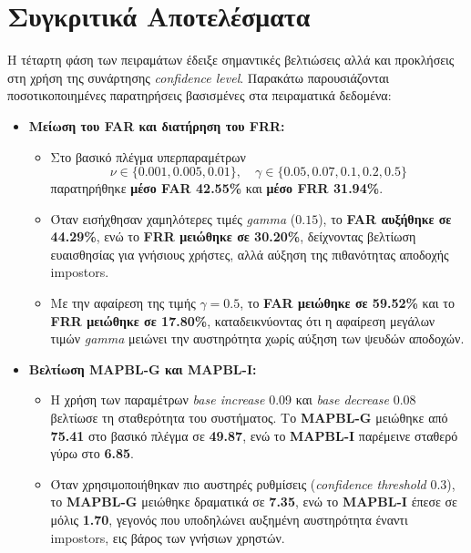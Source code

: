 \section{Συγκριτικά Αποτελέσματα}
\label{sec:experiments_comparative}

Η τέταρτη φάση των πειραμάτων έδειξε σημαντικές βελτιώσεις αλλά και προκλήσεις στη χρήση της συνάρτησης \textit{confidence level}. Παρακάτω παρουσιάζονται ποσοτικοποιημένες παρατηρήσεις βασισμένες στα πειραματικά δεδομένα:

\begin{itemize}
    \item \textbf{Μείωση του FAR και διατήρηση του FRR:}
    \begin{itemize}
        \item Στο βασικό πλέγμα υπερπαραμέτρων 
        \[
        \nu \in \{0.001, 0.005, 0.01\}, \quad \gamma \in \{0.05, 0.07, 0.1, 0.2, 0.5\}
        \]
        παρατηρήθηκε \textbf{μέσο FAR 42.55\%} και \textbf{μέσο FRR 31.94\%}.
        \item Όταν εισήχθησαν χαμηλότερες τιμές \textit{gamma} (\(0.15\)), το \textbf{FAR αυξήθηκε σε 44.29\%}, ενώ το \textbf{FRR μειώθηκε σε 30.20\%}, δείχνοντας βελτίωση ευαισθησίας για γνήσιους χρήστες, αλλά αύξηση της πιθανότητας αποδοχής impostors.
        \item Με την αφαίρεση της τιμής \(\gamma = 0.5\), το \textbf{FAR μειώθηκε σε 59.52\%} και το \textbf{FRR μειώθηκε σε 17.80\%}, καταδεικνύοντας ότι η αφαίρεση μεγάλων τιμών \textit{gamma} μειώνει την αυστηρότητα χωρίς αύξηση των ψευδών αποδοχών.
    \end{itemize}

    \item \textbf{Βελτίωση MAPBL-G και MAPBL-I:}
    \begin{itemize}
        \item Η χρήση των παραμέτρων \textit{base increase} 0.09 και \textit{base decrease} 0.08 βελτίωσε τη σταθερότητα του συστήματος. Το \textbf{MAPBL-G} μειώθηκε από \textbf{75.41} στο βασικό πλέγμα σε \textbf{49.87}, ενώ το \textbf{MAPBL-I} παρέμεινε σταθερό γύρω στο \textbf{6.85}.
        \item Όταν χρησιμοποιήθηκαν πιο αυστηρές ρυθμίσεις (\textit{confidence threshold} 0.3), το \textbf{MAPBL-G} μειώθηκε δραματικά σε \textbf{7.35}, ενώ το \textbf{MAPBL-I} έπεσε σε μόλις \textbf{1.70}, γεγονός που υποδηλώνει αυξημένη αυστηρότητα έναντι impostors, εις βάρος των γνήσιων χρηστών.
    \end{itemize}


\end{itemize}
